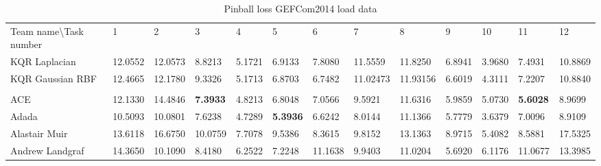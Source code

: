 \begin{table}[!ht]
    \caption{Pinball loss GEFCom2014 load data}
    \label{tab:pinball loss gefcom2014 load data}
    \begin{adjustbox}{width=\textwidth}
    \begin{tabular}{lllllllllllll}
      \toprule
      \midrule
      Team name\textbackslash Task number                       & 1                               & 2                                  & 3                               & 4                              & 5                              & 6       & 7                               & 8       & 9       & 10                             & 11                             & 12                              \\
  
  KQR Laplacian
  & 
  12.0552
  &
  12.0573
  &
  8.8213
  &
  5.1721
  &
  6.9133
  &
  7.8080
  &
  11.5559
  &
  11.8250
  &
  6.8941
  &
  3.9680
  &
  7.4931
  &
  10.8869
  \\
  KQR Gaussian RBF
  & 
  12.4665
  &
  12.1780
  &
  9.3326
  &
  5.1713
  &
  6.8703
  &
  6.7482
  &
  11.02473
  &
  11.93156
  &
  6.6019
  &
  4.3111
  &
  7.2207
  &
  10.8840
  \\
  \\
  ACE                        & 12.1330                         & 14.4846                         & \textbf{7.3933}                          & 4.8213                         & 6.8048                         & 7.0566  & 9.5921                          & 11.6316 & 5.9859  & 5.0730 & \textbf{5.6028}                         & 8.9699                          \\
  Adada                      & 10.5093                         & 10.0801                         & 7.6238                          & 4.7289                         & \textbf{5.3936}                         & 6.6242  & 8.0144                          & 11.1366 & 5.7779  & 3.6379                         & 7.0096                         & 8.9109                          \\
  Alastair Muir              & 13.6118                         & 16.6750                         & 10.0759                         & 7.7078 & 9.5386 & 8.3615  & 9.8152                          & 13.1363 & 8.9715  & 5.4082                         & 8.5881 & 17.5325                         \\
  Andrew Landgraf            & 14.3650                         & 10.1090                         & 8.4180                          & 6.2522                         & 7.2248                         & 11.1638 & 9.9403                          & 11.0204 & 5.6920  & 6.1176                         & 11.0677                        & 13.3985                         \\

\end{tabular}
\end{adjustbox}
\end{table}
